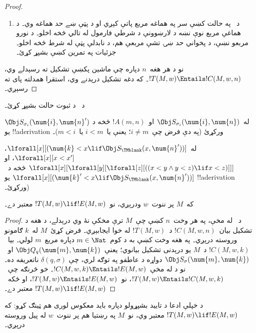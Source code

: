 \documentclass[../../../include/open-logic-section]{subfiles}
\begin{document}
\begin{proof}
\begin{enumerate}
\item د~ په حالت کښې سر په هماغه مربع پاتې کېږي او د پټې ښے حد هماغه وي۔ د هماغې مربع نوې نښه د لارښوونې د شرطي فارمول له تالي څخه اخلو۔ د نورو مربعو نښې، د پخواني حد ښۍ تشې مربعې هم، د نابدلې پټې له شرط څخه اخلو۔ جزئيات په تمرين کښې بشپړ کړئ۔
\end{enumerate}
نو د هر هغه~$n$ دپاره چې ماشين پکښې تشکيل ته رسېدلے وي، $!T(M, w) \Entails !C(M, w, n)$۔ که دغه تشکيل درېدنے وي، استقرا همدلته پای ته رسېږي۔
\end{proof}

\begin{prob}
د~ د ثبوت حالت
 بشپړ کړئ۔
\end{prob}

\begin{prob}
له~$\Obj S_{\sigma_i}(\num{i}, \num{n})$ او~$!A(m, n)$ څخه د
$\Obj S_{\sigma_i}(\num{i}, \num{n}')$ يو !!a{derivation} ورکړئ
(په دې فرض چې~$i \neq m$؛ يعنې يا~$i < m$ يا~$m < i$)۔
\end{prob}

\begin{prob}
له~$\lforall[x][(\num{k} < x \lif \Obj S_\TMblank(x, \num{n}'))]$،
$\lforall[x][x < x']$، او
$\lforall[x][\lforall[y][\lforall[z][ ((x < y \land y < z) \lif x <
      z)]]]$ څخه د~$\lforall[x][(\num{k}' < x \lif \Obj
  S_\TMblank(x, \num{n}'))]$ يو !!a{derivation} ورکړئ۔)
\end{prob}


\begin{lem}
که~$M$ پر ننوت~$w$ ودرېږي، نو~$!T(M, w) \lif
!E(M, w)$ معتبر دے۔
\end{lem}

\begin{proof}
د~ له مخې، په هر وخت~$n$ کښې چې~$M$ ترې مخکې نۀ وي درېدلے، د هغه د تشکيل بيان~$!C(M, w, n)$ د~$!T(M, w)$ له خوا ايجابېږي۔ فرض کړئ~$M$ له~$k$ ګامونو وروسته درېږي۔ په هغه وخت کښې به
د کوم~$m \in \Nat$ دپاره مربع~$m$ لولي۔ بيا~$!C(M, w, k)$ د~$M$
يو درېدنی تشکيل بيانوي؛ يعنې~$\Obj Q_q(\num{m}, \num{k})$ او~$\Obj
S_\sigma(\num{m}, \num{k})$ دواړه د عاطفو په توګه لري، چې
$\delta(q,\sigma)$ ناتعريفه ده۔ نو د
 له مخې~$!C(M, w, k) \Entails
!E(M, w)$۔ خو څرنګه چې~$!T(M, w) \Entails !C(M, w, k)$، نو~$!T(M,
w) \Entails !E(M, w)$، او ځکه~$!T(M, w) \lif !E(M, w)$ معتبر دے۔
\end{proof}


\begin{explain}
د خپلې ادعا د تاييد بشپړولو دپاره بايد معکوس لوری هم ټينګ کړو: که
$!T(M, w) \lif !E(M, w)$ معتبر وي، نو~$M$ په رښتيا هم پر ننوت~$w$
له پيل وروسته درېږي۔
\end{explain}
\end{document}
